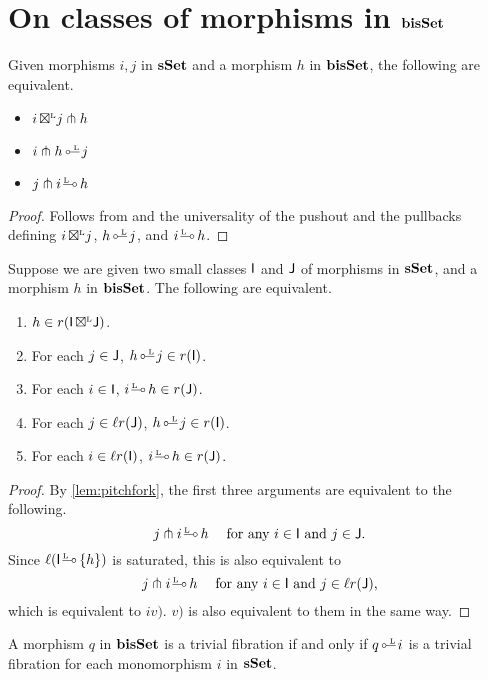 \documentclass[a4paper,  dvipsnames, 11pt]{amsart}
\begin{document}
\section{On classes of morphisms in \texorpdfstring{$\mathbf{bisSet}$}{bisSet}}
\begin{lemma}
	\label{lem:pitchfork}
	Given morphisms $i,j$ in $\mathbf{sSet}$ and a morphism $h$ in $\mathbf{bisSet}$, the following are equivalent.
	\begin{itemize}
		\item %
			$i{\mathrel{\,\boxtimes^{\text{\tiny{L}}}}} j\pitchfork h$
		\item %
			$i\pitchfork h\lollipopL j$
		\item %
			$j\pitchfork i\rollipopL h$
	\end{itemize}
\end{lemma}
\begin{proof}
	Follows from  and the universality of the pushout and the pullbacks defining
	$i{\mathrel{\,\boxtimes^{\text{\tiny{L}}}}} j$, $h\lollipopL j$, and $i\rollipopL h$.
\end{proof}
\begin{lemma}
	\label{lem:rIbtJ}
	Suppose we are given two small classes $\mathsf{I}$ and $\mathsf{J}$ of morphisms in $\mathbf{sSet}$, and a morphism $h$ in $\mathbf{bisSet}$.
	The following are equivalent.
	\begin{enumerate}
		\item %
			$h\in r(\mathsf{I}{\mathrel{\,\boxtimes^{\text{\tiny{L}}}}}\mathsf{J})$.
		\item %
			For each $j\in\mathsf{J}$, $h\lollipopL j\in r(\I)$.
		\item %
			For each $i\in\mathsf{I}$, $i\rollipopL h\in r(\J)$.
		\item %
			For each $j\in\ell r(\mathsf{J})$, $h\lollipopL j\in r(\I)$.
		\item %
			For each $i\in\ell r(\mathsf{I})$, $i\rollipopL h\in r(\J)$.
	\end{enumerate}
\end{lemma}
\begin{proof}
	By \cref{lem:pitchfork}, the first three arguments are equivalent to the following.
	\[
		j \pitchfork i\rollipopL h
		\hspace{3ex}
		\text{for any $i\in\I$ and $j\in\J$.}
	\]
	Since $\ell(\I\rollipopL\{h\})$ is saturated,
	this is also equivalent to
	\[
		j \pitchfork i\rollipopL h
		\hspace{3ex}
		\text{for any $i\in\I$ and $j\in\ell r(\J)$,}
	\]
	which is equivalent to $iv)$.
	$v)$ is also equivalent to them in the same way.
\end{proof}
\begin{corollary}
	\label{cor:biTrivfib}
	A morphism $q$ in $\mathbf{bisSet}$ is a trivial fibration
	if and only if
	$q\lollipopL i$ is a trivial fibration
	for each monomorphism $i$ in $\mathbf{sSet}$.
\end{corollary}
\end{document}
